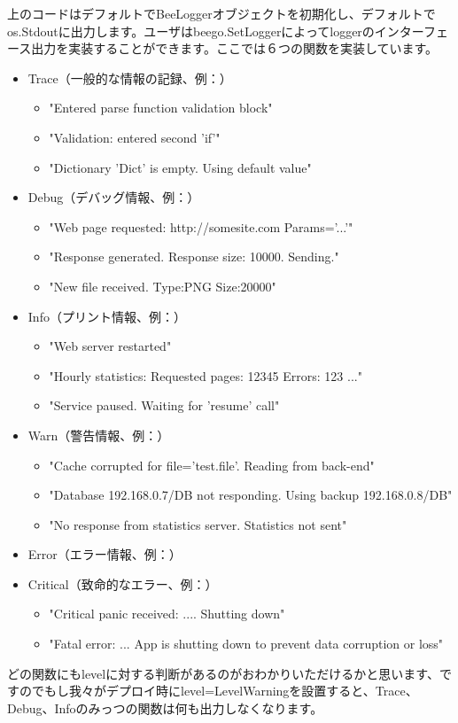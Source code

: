 上のコードはデフォルトでBeeLoggerオブジェクトを初期化し、デフォルトでos.Stdoutに出力します。ユーザはbeego.SetLoggerによってloggerのインターフェース出力を実装することができます。ここでは６つの関数を実装しています。

\begin{itemize}
\item Trace（一般的な情報の記録、例：）
  \begin{itemize}
  \item "Entered parse function validation block"
  \item "Validation: entered second 'if'"
  \item "Dictionary 'Dict' is empty. Using default value"
  \end{itemize}
\item Debug（デバッグ情報、例：）
  \begin{itemize}
  \item "Web page requested: http://somesite.com Params='...'"
  \item "Response generated. Response size: 10000. Sending."
  \item "New file received. Type:PNG Size:20000"
  \end{itemize}
\item Info（プリント情報、例：）
  \begin{itemize}
  \item "Web server restarted"
  \item "Hourly statistics: Requested pages: 12345 Errors: 123 ..."
  \item "Service paused. Waiting for 'resume' call"
  \end{itemize}
\item Warn（警告情報、例：）
  \begin{itemize}
  \item "Cache corrupted for file='test.file'. Reading from back-end"
  \item "Database 192.168.0.7/DB not responding. Using backup 192.168.0.8/DB"
  \item "No response from statistics server. Statistics not sent"
  \end{itemize}
\item Error（エラー情報、例：）
\item Critical（致命的なエラー、例：）
  \begin{itemize}
  \item "Critical panic received: .... Shutting down"
  \item "Fatal error: ... App is shutting down to prevent data corruption or loss"
  \end{itemize}
\end{itemize}

どの関数にもlevelに対する判断があるのがおわかりいただけるかと思います、ですのでもし我々がデプロイ時にlevel=LevelWarningを設置すると、Trace、Debug、Infoのみっつの関数は何も出力しなくなります。
